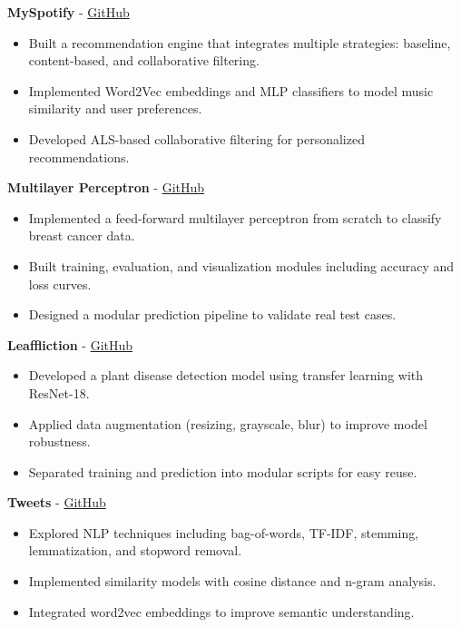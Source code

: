 \documentclass[a4paper,11pt]{article}%
\begin{document}
%
\noindent \textbf{MySpotify} - \href{https://github.com/sboof911/MySpotify}{GitHub}%
\begin{itemize}[leftmargin=2em,label={},parsep=0pt,topsep=1em]%
\item Built a recommendation engine that integrates multiple strategies: baseline, content-based, and collaborative filtering.%
\item Implemented Word2Vec embeddings and MLP classifiers to model music similarity and user preferences.%
\item Developed ALS-based collaborative filtering for personalized recommendations.%
\end{itemize}%
%
\noindent \textbf{Multilayer Perceptron} - \href{https://github.com/sboof911/Multilayer-Perceptron}{GitHub}%
\begin{itemize}[leftmargin=2em,label={},parsep=0pt,topsep=1em]%
\item Implemented a feed-forward multilayer perceptron from scratch to classify breast cancer data.%
\item Built training, evaluation, and visualization modules including accuracy and loss curves.%
\item Designed a modular prediction pipeline to validate real test cases.%
\end{itemize}%
%
\noindent \textbf{Leaffliction} - \href{https://github.com/sboof911/Leaffliction}{GitHub}%
\begin{itemize}[leftmargin=2em,label={},parsep=0pt,topsep=1em]%
\item Developed a plant disease detection model using transfer learning with ResNet-18.%
\item Applied data augmentation (resizing, grayscale, blur) to improve model robustness.%
\item Separated training and prediction into modular scripts for easy reuse.%
\end{itemize}%
%
\noindent \textbf{Tweets} - \href{https://github.com/sboof911/tweets}{GitHub}%
\begin{itemize}[leftmargin=2em,label={},parsep=0pt,topsep=1em]%
\item Explored NLP techniques including bag-of-words, TF-IDF, stemming, lemmatization, and stopword removal.%
\item Implemented similarity models with cosine distance and n-gram analysis.%
\item Integrated word2vec embeddings to improve semantic understanding.%
\end{itemize}%
\end{document}

